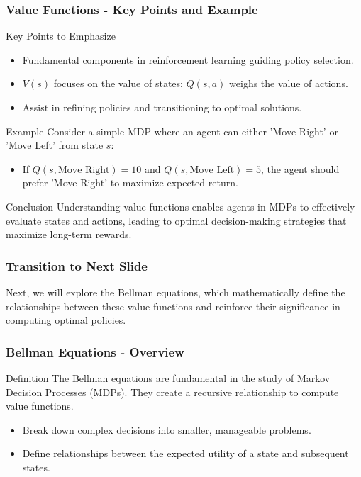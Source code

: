\documentclass{beamer}
\begin{document}
\begin{frame}[fragile]
    \frametitle{Value Functions - Key Points and Example}
    \begin{block}{Key Points to Emphasize}
        \begin{itemize}
            \item Fundamental components in reinforcement learning guiding policy selection.
            \item \( V(s) \) focuses on the value of states; \( Q(s, a) \) weighs the value of actions.
            \item Assist in refining policies and transitioning to optimal solutions.
        \end{itemize}
    \end{block}
    
    \begin{block}{Example}
        Consider a simple MDP where an agent can either 'Move Right' or 'Move Left' from state \( s \):
        \begin{itemize}
            \item If \( Q(s, \text{Move Right}) = 10 \) and \( Q(s, \text{Move Left}) = 5 \), the agent should prefer 'Move Right' to maximize expected return.
        \end{itemize}
    \end{block}

    \begin{block}{Conclusion}
        Understanding value functions enables agents in MDPs to effectively evaluate states and actions, leading to optimal decision-making strategies that maximize long-term rewards.
    \end{block}
\end{frame}

\begin{frame}[fragile]
    \frametitle{Transition to Next Slide}
    Next, we will explore the Bellman equations, which mathematically define the relationships between these value functions and reinforce their significance in computing optimal policies.
\end{frame}

\begin{frame}[fragile]
    \frametitle{Bellman Equations - Overview}
    \begin{block}{Definition}
        The Bellman equations are fundamental in the study of Markov Decision Processes (MDPs).
        They create a recursive relationship to compute value functions.
    \end{block}
    \begin{itemize}
        \item Break down complex decisions into smaller, manageable problems.
        \item Define relationships between the expected utility of a state and subsequent states.
    \end{itemize}
\end{frame}
\end{document}
